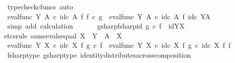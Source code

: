 \begin{isabellebody}
\ {\isacharparenleft}{\kern0pt}typecheck{\isacharunderscore}{\kern0pt}cfuncs{\isacharcomma}{\kern0pt}\ auto{\isacharparenright}{\kern0pt}\isanewline
\ \ \ \ \isamarkupfalse%
\ \isamarkupfalse%
\ {\isachardoublequoteopen}eval{\isacharunderscore}{\kern0pt}func\ Y\ A\ {\isasymcirc}\isactrlsub c\ id\isactrlsub c\ A\ {\isasymtimes}\isactrlsub f\ f\isactrlsup {\isasymsharp}\ {\isasymcirc}\isactrlsub c\ g\isactrlsup {\isasymsharp}\ {\isacharequal}{\kern0pt}\ eval{\isacharunderscore}{\kern0pt}func\ Y\ A\ {\isasymcirc}\isactrlsub c\ id\isactrlsub c\ A\ {\isasymtimes}\isactrlsub f\ id\isactrlsub c\ {\isacharparenleft}{\kern0pt}Y\isactrlbsup A\isactrlesup {\isacharparenright}{\kern0pt}{\isachardoublequoteclose}\isanewline
\ \ \ \ \ \ \isamarkupfalse%
\ {\isacharparenleft}{\kern0pt}simp\ add{\isacharcolon}{\kern0pt}\ calculation{\isacharparenright}{\kern0pt}\isanewline
\ \ \isamarkupfalse%
\isanewline
\isanewline
\ \ \isamarkupfalse%
\ gsharp{\isacharunderscore}{\kern0pt}fsharp{\isacharunderscore}{\kern0pt}id{\isacharcolon}{\kern0pt}\ {\isachardoublequoteopen}g\isactrlsup {\isasymsharp}\ {\isasymcirc}\isactrlsub c\ f\isactrlsup {\isasymsharp}\ {\isacharequal}{\kern0pt}\ id{\isacharparenleft}{\kern0pt}Y\isactrlbsup X\isactrlesup {\isacharparenright}{\kern0pt}{\isachardoublequoteclose}\isanewline
\ \ \isamarkupfalse%
{\isacharparenleft}{\kern0pt}etcs{\isacharunderscore}{\kern0pt}rule\ same{\isacharunderscore}{\kern0pt}evals{\isacharunderscore}{\kern0pt}equal{\isacharbrackleft}{\kern0pt}\ X\ {\isacharequal}{\kern0pt}\ Y{\isacharcomma}{\kern0pt}\ \ A\ {\isacharequal}{\kern0pt}\ X{\isacharbrackright}{\kern0pt}{\isacharparenright}{\kern0pt}\isanewline
\ \ \ \ \isamarkupfalse%
\ {\isachardoublequoteopen}eval{\isacharunderscore}{\kern0pt}func\ Y\ X\ {\isasymcirc}\isactrlsub c\ id\isactrlsub c\ X\ {\isasymtimes}\isactrlsub f\ g\isactrlsup {\isasymsharp}\ {\isasymcirc}\isactrlsub c\ f\isactrlsup {\isasymsharp}\ {\isacharequal}{\kern0pt}\ eval{\isacharunderscore}{\kern0pt}func\ Y\ X\ {\isasymcirc}\isactrlsub c\ {\isacharparenleft}{\kern0pt}id\isactrlsub c\ X\ {\isasymtimes}\isactrlsub f\ g\isactrlsup {\isasymsharp}{\isacharparenright}{\kern0pt}\ {\isasymcirc}\isactrlsub c\ {\isacharparenleft}{\kern0pt}id\isactrlsub c\ X\ {\isasymtimes}\isactrlsub f\ f\isactrlsup {\isasymsharp}{\isacharparenright}{\kern0pt}{\isachardoublequoteclose}\isanewline
\ \ \ \ \ \ \isamarkupfalse%
\ fsharp{\isacharunderscore}{\kern0pt}type\ gsharp{\isacharunderscore}{\kern0pt}type\ identity{\isacharunderscore}{\kern0pt}distributes{\isacharunderscore}{\kern0pt}across{\isacharunderscore}{\kern0pt}composition\ \isamarkupfalse%

\end{isabellebody}
